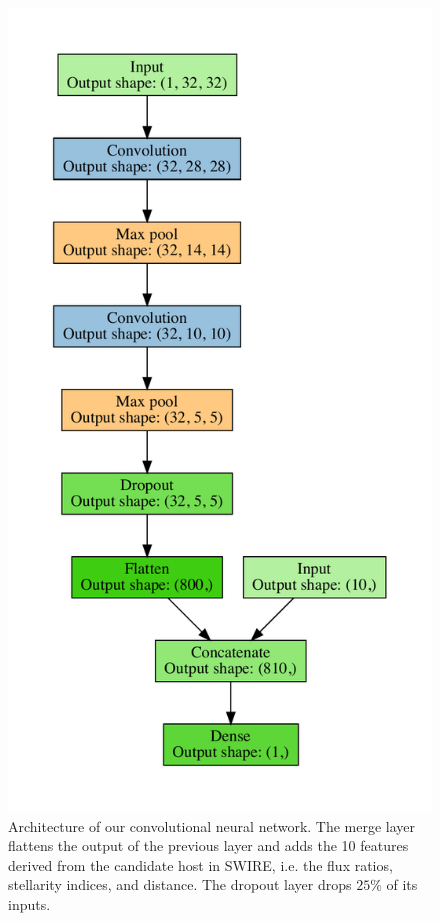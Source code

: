 \documentclass[fleqn,usenatbib,usedcolumn]{mnras}
\begin{document}
\begin{figure}
        \includegraphics[width=\linewidth]{images/cnn_model_graph}
        \caption{Architecture of our convolutional neural network. The merge
          layer flattens the output of the previous layer and adds the 10
          features derived from the candidate host in SWIRE, i.e. the flux
          ratios, stellarity indices, and distance. The dropout layer drops
          $25\%$ of its inputs.}
        \label{fig:cnn}
      \end{figure}
\end{document}
